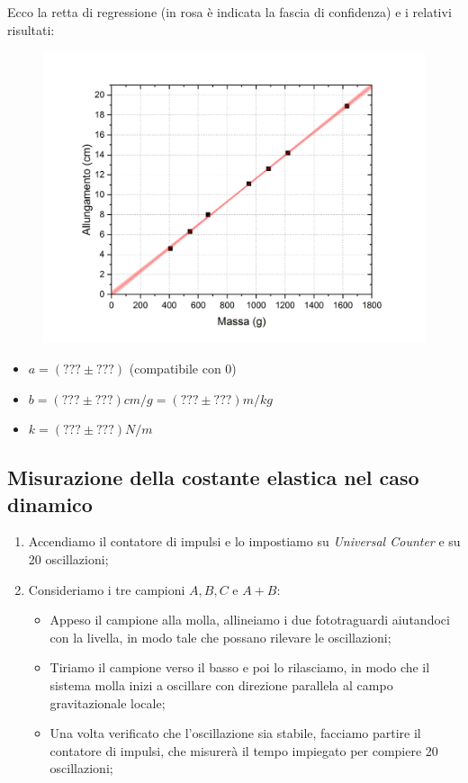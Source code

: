 \documentclass{article}
\begin{document}
Ecco la retta di regressione (in rosa è indicata la fascia di confidenza) e i relativi risultati:
\begin{figure}[h]
    \includegraphics[width=\textwidth]{SaticoReg.jpg}
\end{figure}
\begin{itemize}
    \item $a = \left(???\pm???\right)$ (compatibile con 0)
    \item $b = \left(???\pm???\right)\unit{cm\per g}=\left(???\pm???\right)\unit{m\per kg}$
    \item $k = \left(???\pm???\right)\unit{N\per m}$
\end{itemize}

\subsection{Misurazione della costante elastica nel caso dinamico}
\begin{enumerate}
    \item Accendiamo il contatore di impulsi e lo impostiamo su \emph{Universal Counter} e su 20 oscillazioni;
    \item Consideriamo i tre campioni $A, B, C$ e $A+B$:
    \begin{itemize}
        \item Appeso il campione alla molla, allineiamo i due fototraguardi aiutandoci con la livella, in modo tale che possano rilevare le oscillazioni;
        \item Tiriamo il campione verso il basso e poi lo rilasciamo, in modo che il sistema molla inizi a oscillare con direzione parallela al campo gravitazionale locale;
        \item Una volta verificato che l’oscillazione sia stabile, facciamo partire il contatore di impulsi, che misurerà il tempo impiegato per compiere 20 oscillazioni;
    \end{itemize}
\end{enumerate}
\end{document}

